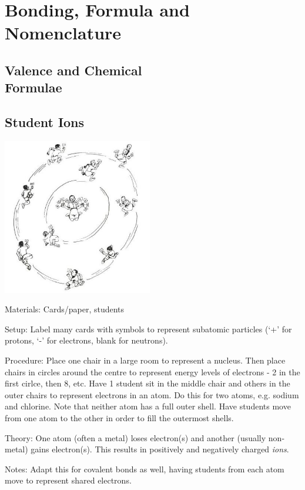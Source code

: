 \section{Bonding, Formula and Nomenclature}

\begin{multicols}{2}


\section*{Valence and Chemical \hfill \\ Formulae}


\subsection{Student Ions}

\begin{center}
\includegraphics[width=0.49\textwidth]{./img/source/student-ions.jpg}
\end{center}

\begin{description*}
\item[Materials:]{Cards/paper, students}
\item[Setup:]{Label many cards with symbols to represent subatomic particles (`+' for protons, `-' for electrons, blank for neutrons).}
\item[Procedure:]{Place one chair in a large room to represent a nucleus. Then place chairs in circles around the centre to represent energy levels of electrons - 2 in the first cirlce, then 8, etc. Have 1 student sit in the middle chair and others in the outer chairs to represent electrons in an atom. Do this for two atoms, e.g. sodium and chlorine. Note that neither atom has a full outer shell. Have students move from one atom to the other in order to fill the outermost shells. }
\item[Theory:]{One atom (often a metal) loses electron(s) and another (usually non-metal) gains electron(s). This results in positively and negatively charged \emph{ions}.}
\item[Notes:]{Adapt this for covalent bonds as well, having students from each atom move to represent shared electrons.}
\end{description*}


\end{multicols}
